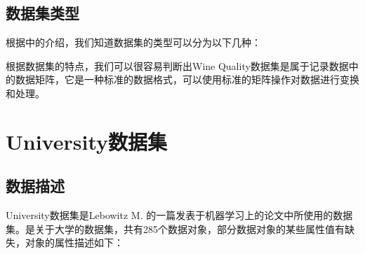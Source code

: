 \documentclass[a4paper, 11pt, hyperref, titlepage]{article}
\newcommand{\hei}[1]{{\HEI #1}}
\begin{document}
\subsection{\hei{数据集类型}}
根据\cite{FanMing2006}中的介绍，我们知道数据集的类型可以分为以下几种：

\begin{enumerate}
\end{enumerate}
根据数据集的特点，我们可以很容易判断出Wine Quality数据集是属于记录数据中的数据矩阵，它是一种标准的数据格式，可以使用标准的矩阵操作对数据进行变换和处理。


\section{\hei{University数据集}}

\subsection{\hei{数据描述}}
University数据集是Lebowitz M. 的一篇发表于机器学习上的论文中所使用的数据集\cite{lebowitz1984concept}。是关于大学的数据集，共有285个数据对象，部分数据对象的某些属性值有缺失，对象的属性描述如下：
\end{document}
